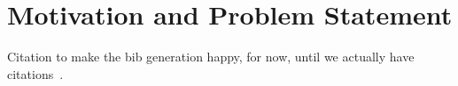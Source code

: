 \section{Motivation and Problem Statement}


Citation to make the bib generation happy, for now, until we actually have
citations~\cite{Eucalyptus}.

